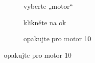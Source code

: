 \documentclass[../main.tex]{subfiles}
\begin{document}
	\begin{figure}[h!]%
		\begin{subfigure}{.3\textwidth}%
			\centering%
			\caption{vyberte „motor“}%
		\end{subfigure} \hspace{.045\textwidth}%
		\begin{subfigure}{.3\textwidth}%
			\centering%
			\caption{klikněte na ok}%
		\end{subfigure} \hspace{.045\textwidth}%
		\begin{subfigure}{.3\textwidth}%
			\centering%
			\caption{opakujte pro motor 10}%
		\end{subfigure}%
	\end{figure}
\end{document}
